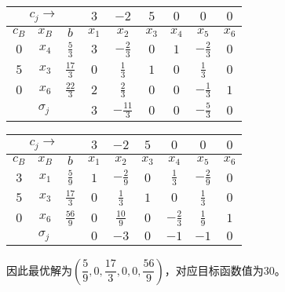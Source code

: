 \begin{solution}
        \begin{table}[H]
            \centering
            \begin{tabular}{|c|c|c|c|c|c|c|c|c|}
                \hline
                \multicolumn{3}{|c|}{$c_j\rightarrow$} & $3$ & $-2$ & $5$ & $0$ & $0$ & $0$ \\
                \hline
                $c_B$ & $x_B$ & $b$ & $x_1$ & $x_2$ & $x_3$ & $x_4$ & $x_5$ & $x_6$ \\
                \hline
                $0$& $x_4$ & $\tfrac{5}{3}$ & $3$ & $-\tfrac{2}{3}$ & $0$ & $1$ & $-\tfrac{2}{3}$ & $0$\\
                \hline
                $5$& $x_3$ & $\tfrac{17}{3}$ & $0$ & $\tfrac{1}{3}$ & $1$ & $0$ & $\tfrac{1}{3}$ & $0$\\
                \hline
                $0$& $x_6$ & $\tfrac{22}{3}$ & $2$ & $\tfrac{2}{3}$ & $0$ & $0$ & $-\tfrac{1}{3}$ & $1$\\
                \hline
                \multicolumn{3}{|c|}{$\sigma_j$} & $3$ & $-\tfrac{11}{3}$ & $0$ & $0$ & $-\tfrac{5}{3}$ & $0$\\
                \hline
            \end{tabular}
        \end{table}

        \begin{table}[H]
            \centering
            \begin{tabular}{|c|c|c|c|c|c|c|c|c|}
                \hline
                \multicolumn{3}{|c|}{$c_j\rightarrow$} & $3$ & $-2$ & $5$ & $0$ & $0$ & $0$ \\
                \hline
                $c_B$ & $x_B$ & $b$ & $x_1$ & $x_2$ & $x_3$ & $x_4$ & $x_5$ & $x_6$ \\
                \hline
                $3$& $x_1$ & $\tfrac59$ & $1$ & $-\tfrac29$ & $0$ & $\tfrac13$ & $-\tfrac29$ & $0$\\
                \hline
                $5$& $x_3$ & $\tfrac{17}3$ & $0$ & $\tfrac13$ & $1$ & $0$ & $\tfrac13$ & $0$\\
                \hline
                $0$& $x_6$ & $\tfrac{56}9$ & $0$ & $\tfrac{10}9$ & $0$ & $-\tfrac23$ & $\tfrac19$ & $1$\\
                \hline
                \multicolumn{3}{|c|}{$\sigma_j$} & $0$ & $-3$ & $0$ & $-1$ & $-1$ & $0$\\
                \hline
            \end{tabular}
        \end{table}

        因此最优解为$\left(\dfrac59,0,\dfrac{17}3,0,0,\dfrac{56}9\right)$，对应目标函数值为$30$。
    \end{solution}

